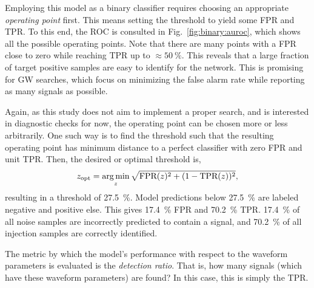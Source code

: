 Employing this model as a binary classifier requires choosing an appropriate \emph{operating point} first. This means setting the threshold to yield some FPR and TPR. To this end, the ROC is consulted in Fig.~\ref{fig:binary:auroc}, which shows all the possible operating points. Note that there are many points with a FPR close to zero while reaching TPR up to $\approx\SI{50}{\percent}$. This reveals that a large fraction of target positive samples are easy to identify for the network. This is promising for GW searches, which focus on minimizing the false alarm rate while reporting as many signals as possible.

Again, as this study does not aim to implement a proper search, and is interested in diagnostic checks for now, the operating point can be chosen more or less arbitrarily. One such way is to find the threshold such that the resulting operating point has minimum distance to a perfect classifier with zero FPR and unit TPR. Then, the desired or optimal threshold is,
\begin{equation}
	z_\text{opt} = \operatorname*{arg\,min}_{z} \sqrt{\text{FPR}(z)^2 + (1-\text{TPR}(z))^2},
\end{equation}
resulting in a threshold of \SI{27.5}{\percent}. Model predictions below \SI{27.5}{\percent} are labeled negative and positive else. This gives \SI{17.4}{\percent} FPR and \SI{70.2}{\percent} TPR. \SI{17.4}{\percent} of all noise samples are incorrectly predicted to contain a signal, and \SI{70.2}{\percent} of all injection samples are correctly identified. 


The metric by which the model's performance with respect to the waveform parameters is evaluated is the \emph{detection ratio}. That is, how many signals (which have these waveform parameters) are found? In this case, this is simply the TPR. 

